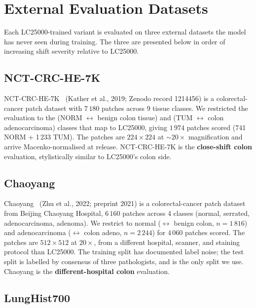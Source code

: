 \FloatBarrier


\section{External Evaluation Datasets}
\label{sec:meth-external-datasets}

Each LC25000-trained variant is evaluated on three external datasets the model has never seen during training. The three are presented below in order of increasing shift severity relative to LC25000.

\subsection{NCT-CRC-HE-7K}

NCT-CRC-HE-7K~\cite{kather2019nct} (Kather et al., 2019; Zenodo record 1214456) is a colorectal-cancer patch dataset with $7\,180$ patches across 9 tissue classes. We restricted the evaluation to the (NORM $\leftrightarrow$ benign colon tissue) and (TUM $\leftrightarrow$ colon adenocarcinoma) classes that map to LC25000, giving $1\,974$ patches scored (741 NORM + 1\,233 TUM). The patches are $224 \times 224$ at $\sim 20\times$ magnification and arrive Macenko-normalised at release. NCT-CRC-HE-7K is the \textbf{close-shift colon} evaluation, stylistically similar to LC25000's colon side.

\subsection{Chaoyang}

Chaoyang~\cite{zhu2021chaoyang} (Zhu et al., 2022; preprint 2021) is a colorectal-cancer patch dataset from Beijing Chaoyang Hospital, $6\,160$ patches across 4 classes (normal, serrated, adenocarcinoma, adenoma). We restrict to normal ($\leftrightarrow$ benign colon, $n = 1\,816$) and adenocarcinoma ($\leftrightarrow$ colon adeno, $n = 2\,244$) for $4\,060$ patches scored. The patches are $512 \times 512$ at $20\times$, from a different hospital, scanner, and staining protocol than LC25000. The training split has documented label noise; the test split is labelled by consensus of three pathologists, and is the only split we use. Chaoyang is the \textbf{different-hospital colon} evaluation.

\subsection{LungHist700}

